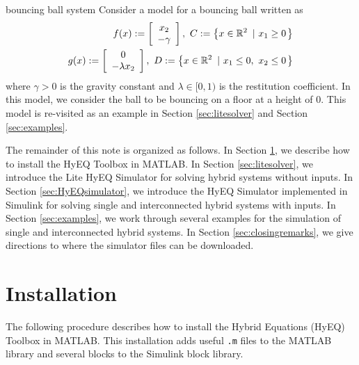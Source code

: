 \documentclass{article}
\begin{document}
\begin{example}{bouncing ball system}
\label{ex:bb}
Consider a model for a bouncing ball written as
\begin{eqnarray}
\label{eq:bbmodel}
f(x):=\left[
 \begin{array}{c}
   x_{2} \\
 -\gamma
 \end{array}
\right],\ 
   C : = \defset{ x \in \Re^{2}}{x_{1} \geq 0} \\
\label{eq:bbmodel2}
g(x):=\left[ \begin{array}{c}
 0 \\
- \lambda x_{2}
\end{array}
\right],\ 
    D: = \defset{ x \in \Re^{2}}{x_{1} \leq 0, \
  x_{2} \leq 0}
\end{eqnarray}
where $\gamma >0$ is the gravity constant and $\lambda \in [0,1)$ is the restitution coefficient. In this model, we consider the ball to be bouncing on a floor at a height of $0$. This model is re-visited as an example in Section \ref{sec:litesolver} and Section \ref{sec:examples}.
\end{example}

The remainder of this note is organized as follows. In Section \ref{sec:installation}, we describe how to install the HyEQ Toolbox in MATLAB. In Section \ref{sec:litesolver}, we introduce the Lite HyEQ Simulator for solving hybrid systems without inputs. In Section \ref{sec:HyEQsimulator}, we introduce the HyEQ Simulator implemented in Simulink for solving single and interconnected hybrid systems with inputs.
In Section \ref{sec:examples}, we work through several examples for the simulation of single and interconnected hybrid systems. In Section \ref{sec:closingremarks}, we give directions to where the simulator files can be downloaded.

\section{Installation}
\label{sec:installation}

The following procedure describes how to install the Hybrid Equations (HyEQ) Toolbox in MATLAB. This installation adds useful {\tt .m} files to the MATLAB library and several blocks to the Simulink block library.
\end{document}
